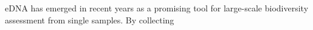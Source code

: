 
eDNA has emerged in recent years as a promising tool for large-scale biodiversity assessment from single samples. By collecting 





